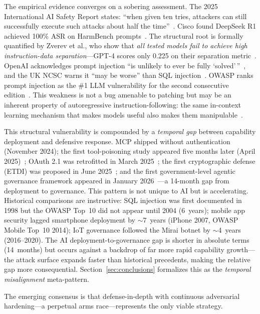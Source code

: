 The empirical evidence converges on a sobering assessment. The 2025 International AI Safety Report states: ``when given ten tries, attackers can still successfully execute such attacks about half the time''~\cite{aisafetyreport2025}. Cisco found DeepSeek R1 achieved 100\% ASR on HarmBench prompts~\cite{cisco2025deepseek}. The structural root is formally quantified by Zverev et al., who show that \emph{all tested models fail to achieve high instruction-data separation}---GPT-4 scores only 0.225 on their separation metric~\cite{zverev2025separation}. OpenAI acknowledges prompt injection ``is unlikely to ever be fully `solved'\,''~\cite{openai2025atlas}, and the UK NCSC warns it ``may be worse'' than SQL injection~\cite{ncsc2025promptinjection}. OWASP ranks prompt injection as the \#1 LLM vulnerability for the second consecutive edition~\cite{owasp2025}. This weakness is not a bug amenable to patching but may be an inherent property of autoregressive instruction-following: the same in-context learning mechanism that makes models useful also makes them manipulable~\cite{zverev2025separation}.

This structural vulnerability is compounded by a \emph{temporal gap} between capability deployment and defensive response. MCP shipped without authentication (November 2024); the first tool-poisoning study appeared five months later (April 2025)~\cite{invariant2025toolpoisoning}; OAuth 2.1 was retrofitted in March 2025~\cite{mcpspec2025}; the first cryptographic defense (ETDI) was proposed in June 2025~\cite{bhatt2025etdi}; and the first government-level agentic governance framework appeared in January 2026~\cite{imda2026agentic}---a 14-month gap from deployment to governance. This pattern is not unique to AI but is accelerating. Historical comparisons are instructive: SQL injection was first documented in 1998 but the OWASP Top~10 did not appear until 2004 (6~years); mobile app security lagged smartphone deployment by $\sim$7~years (iPhone 2007, OWASP Mobile Top~10 2014); IoT governance followed the Mirai botnet by $\sim$4~years (2016--2020). The AI deployment-to-governance gap is shorter in absolute terms (14~months) but occurs against a backdrop of far more rapid capability growth---the attack surface expands faster than historical precedents, making the relative gap more consequential. Section~\ref{sec:conclusions} formalizes this as the \emph{temporal misalignment} meta-pattern.

The emerging consensus is that defense-in-depth with continuous adversarial hardening---a perpetual arms race---represents the only viable strategy.


